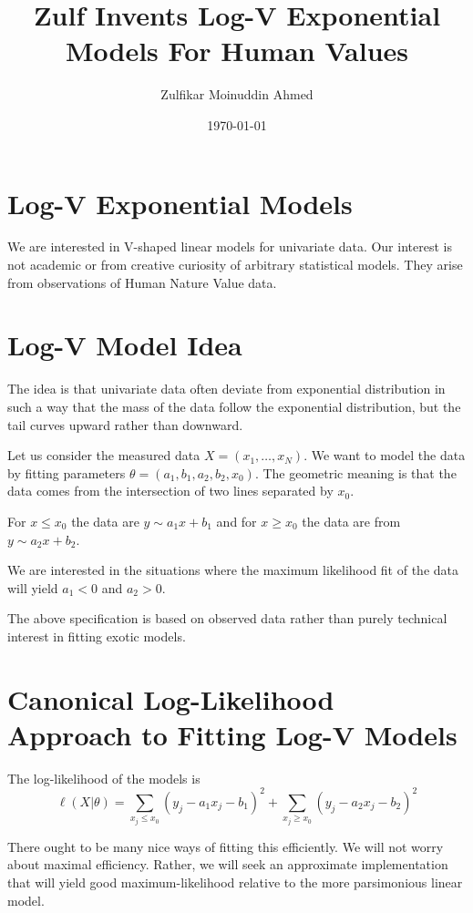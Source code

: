 \documentclass{amsart}
\title{Zulf Invents Log-V Exponential Models For Human Values}
\author{Zulfikar Moinuddin Ahmed}
\date{\today}
\begin{document}
\maketitle

\section{Log-V Exponential Models}

We are interested in V-shaped linear models for univariate data.  Our interest is not academic or from creative curiosity of arbitrary statistical models.  They arise from observations of Human Nature Value data.  

\section{Log-V Model Idea}

The idea is that univariate data often deviate from exponential distribution in such a way that the mass of the data follow the exponential distribution, but the tail curves upward rather than downward.

Let us consider the measured data $X=(x_1, \dots, x_N)$.  We want to model the data by fitting parameters $\theta = (a_1, b_1, a_2, b_2, x_0)$.  The geometric meaning is that the data comes from the intersection of two lines separated by $x_0$.  

For $x\le x_0$ the data are $y \sim a_1 x + b_1$ and for $x\ge x_0$ the data are from $y \sim a_2 x + b_2$. 

We are interested in the situations where the maximum likelihood fit of the data will yield $a_1 < 0$ and $a_2>0$. 

The above specification is based on observed data rather than purely technical interest in fitting exotic models.

\section{Canonical Log-Likelihood Approach to Fitting Log-V Models}

The log-likelihood of the models is 
\begin{equation}
\ell(X | \theta ) = \sum_{x_j \le x_0} (y_j - a_1 x_j - b_1)^2 + \sum_{x_j \ge x_0} (y_j - a_2 x_j - b_2)^2
\end{equation}

There ought to be many nice ways of fitting this efficiently.  We will not worry about maximal efficiency.  Rather, we will seek an approximate implementation that will yield good maximum-likelihood relative to the more parsimonious linear model.  
\end{document}
